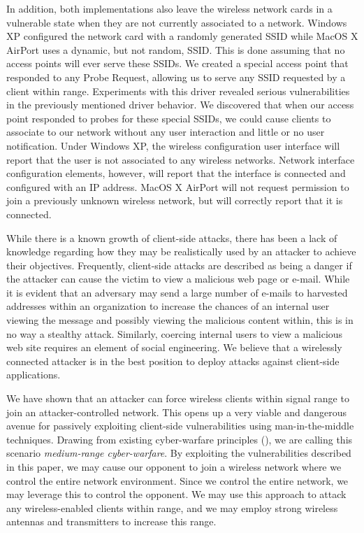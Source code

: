 \documentclass[10pt,twocolumn]{article}
\begin{document}
In addition, both implementations also leave the wireless network
cards in a vulnerable state when they are not currently associated to
a network.  Windows XP configured the network card with a randomly
generated SSID while MacOS X AirPort uses a dynamic, but not random,
SSID.  This is done assuming that no access points will ever serve
these SSIDs.  We created a special access point that responded to any
Probe Request, allowing us to serve any SSID requested by a client
within range.  Experiments with this driver revealed serious
vulnerabilities in the previously mentioned driver behavior.  We
discovered that when our access point responded to probes for these
special SSIDs, we could cause clients to associate to our network
without any user interaction and little or no user notification.
Under Windows XP, the wireless configuration user interface will
report that the user is not associated to any wireless networks.
Network interface configuration elements, however, will report that
the interface is connected and configured with an IP address.  MacOS X
AirPort will not request permission to join a previously unknown
wireless network, but will correctly report that it is connected.

While there is a known growth of client-side attacks, there has been a
lack of knowledge regarding how they may be realistically used by an
attacker to achieve their objectives.  Frequently, client-side attacks
are described as being a danger if the attacker can cause the victim
to view a malicious web page or e-mail.  While it is evident that an
adversary may send a large number of e-mails to harvested addresses
within an organization to increase the chances of an internal user
viewing the message and possibly viewing the malicious content within,
this is in no way a stealthy attack.  Similarly, coercing internal
users to view a malicious web site requires an element of social
engineering.  We believe that a wirelessly connected attacker is in
the best position to deploy attacks against client-side applications.

We have shown that an attacker can force wireless clients within
signal range to join an attacker-controlled network.  This opens up a
very viable and dangerous avenue for passively exploiting client-side
vulnerabilities using man-in-the-middle techniques.  Drawing from
existing cyber-warfare principles (\cite{parks01cyberwar}), we are
calling this scenario {\it medium-range cyber-warfare}.  By exploiting
the vulnerabilities described in this paper, we may cause our opponent
to join a wireless network where we control the entire network
environment.  Since we control the entire network, we may leverage
this to control the opponent.  We may use this approach to attack any
wireless-enabled clients within range, and we may employ strong
wireless antennas and transmitters to increase this range.
\end{document}
